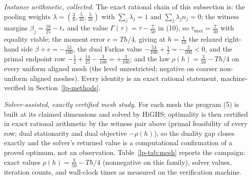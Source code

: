 \documentclass[10pt,twocolumn]{article}
\theoremstyle{plain}
\theoremstyle{definition}
\theoremstyle{remark}
\begin{document}
\emph{Instance arithmetic, collected.} The exact rational chain of this
subsection is: the pooling weights
\(\lambda = (\tfrac38, \tfrac5{16}, \tfrac5{16})\) with
\(\sum_j \lambda_j = 1\) and \(\sum_j \lambda_j n_j = 0\); the
witness margins \(\beta_j = \tfrac{16}{25} - t_*\) and the value
\(\Gamma(\tau) = \tau - \tfrac7{50}\) in (10), so
\(\tau_{\max} = \tfrac7{50}\) with equality viable; the moment error
\(e = Th/4\), giving at \(h = \tfrac1{10}\) the relaxed right-hand
side \(\beta + e = -\tfrac{53}{100}\), the dual Farkas value
\(-\tfrac{53}{100} + \tfrac12 = -\tfrac3{100} < 0\), and the primal
endpoint row \( -\tfrac12 + \tfrac{14}{25} - \tfrac3{100} =
+\tfrac3{100}\); and the law \(\rho(h) = \tfrac3{50} - Th/4\) on every uniform aligned
mesh (the level unrestricted; negative on coarser non-uniform aligned
meshes). Every identity is an
exact rational statement, machine-verified in
Section~\ref{lp-methods}.

\emph{Solver-assisted, exactly certified mesh study.} For each mesh the
program (5) is built
at its claimed dimensions and solved by HiGHS; optimality is then certified
in exact rational arithmetic by the witness pair above (primal feasibility of
every row; dual stationarity and dual objective \(-\rho(h)\)), so the duality
gap closes exactly and the solver's returned value is a computational
confirmation of a proved optimum, not an observation.
Table~\ref{lp-tab:mesh} reports the campaign: exact values
\(\rho(h) = \tfrac{3}{50} - Th/4\) (nonnegative on this family), solver values, iteration
counts, and wall-clock times as measured on the verification machine.
\end{document}
